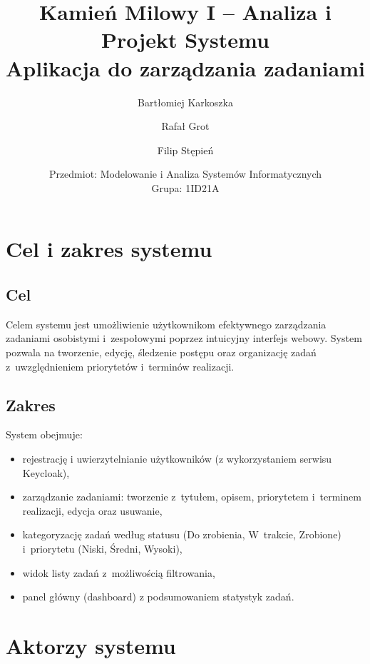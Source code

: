 \documentclass[12pt, a4paper, oneside]{article}
\title{\LARGE\bfseries Kamień Milowy I -- Analiza i Projekt Systemu\\[0.8cm]
  {\Large Aplikacja do zarządzania zadaniami}}
\author{Bartłomiej Karkoszka \and Rafał Grot \and Filip Stępień}
\date{Przedmiot: Modelowanie i Analiza Systemów Informatycznych\\Grupa: 1ID21A}
\begin{document}

\maketitle
\thispagestyle{empty}

\vspace{1.5cm}

\section{Cel i zakres systemu}

\subsection{Cel}
Celem systemu jest umożliwienie użytkownikom efektywnego zarządzania zadaniami osobistymi i~zespołowymi poprzez intuicyjny interfejs webowy. System pozwala na tworzenie, edycję, śledzenie postępu oraz organizację zadań z~uwzględnieniem priorytetów i~terminów realizacji.

\subsection{Zakres}
System obejmuje:
\begin{itemize}
  \item rejestrację i uwierzytelnianie użytkowników (z wykorzystaniem serwisu Keycloak),
  \item zarządzanie zadaniami: tworzenie z~tytułem, opisem, priorytetem i~terminem realizacji, edycja oraz usuwanie,
  \item kategoryzację zadań według statusu (Do zrobienia, W~trakcie, Zrobione) i~priorytetu (Niski, Średni, Wysoki),
  \item widok listy zadań z~możliwością filtrowania,
  \item panel główny (dashboard) z podsumowaniem statystyk zadań.
\end{itemize}

\section{Aktorzy systemu}
\end{document}
